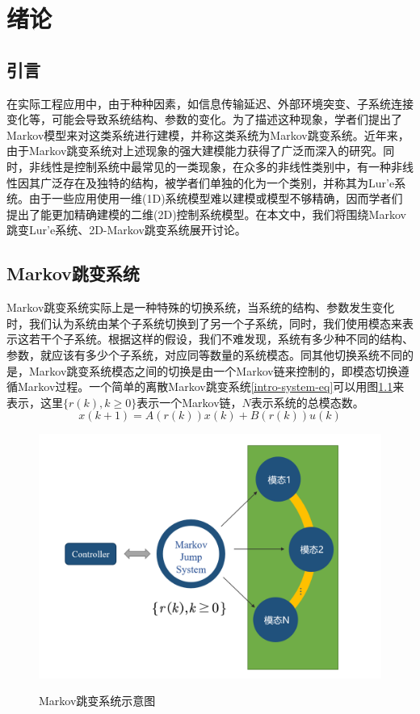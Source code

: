 
\chapter{绪论}
\section{引言}
	在实际工程应用中，由于种种因素，如信息传输延迟、外部环境突变、子系统连接变化等，可能会导致系统结构、参数的变化。为了描述这种现象，学者们提出了Markov模型来对这类系统进行建模，并称这类系统为Markov跳变系统。近年来，由于Markov跳变系统对上述现象的强大建模能力获得了广泛而深入的研究。同时，非线性是控制系统中最常见的一类现象，在众多的非线性类别中，有一种非线性因其广泛存在及独特的结构，被学者们单独的化为一个类别，并称其为Lur'e系统。由于一些应用使用一维(1D)系统模型难以建模或模型不够精确，因而学者们提出了能更加精确建模的二维(2D)控制系统模型。在本文中，我们将围绕Markov跳变Lur'e系统、2D-Markov跳变系统展开讨论。

\section{Markov跳变系统}
	Markov跳变系统实际上是一种特殊的切换系统，当系统的结构、参数发生变化时，我们认为系统由某个子系统切换到了另一个子系统，同时，我们使用模态来表示这若干个子系统。根据这样的假设，我们不难发现，系统有多少种不同的结构、参数，就应该有多少个子系统，对应同等数量的系统模态。同其他切换系统不同的是，Markov跳变系统模态之间的切换是由一个Markov链来控制的，即模态切换遵循Markov过程。一个简单的离散Markov跳变系统\eqref{intro-system-eq}可以用图\ref{intro_system}来表示，这里$\{r(k),k\geq 0 \}$表示一个Markov链，$N$表示系统的总模态数。
	\begin{equation}\label{intro-system-eq}
		x(k+1)=A(r(k))x(k)+B(r(k))u(k)
	\end{equation}
	\begin{figure}[!htb] 
		\centering\includegraphics[scale=0.25]{./figures/introduction/system.png}\\ 
		\caption{Markov跳变系统示意图}
		\label{intro_system}
	\end{figure}

